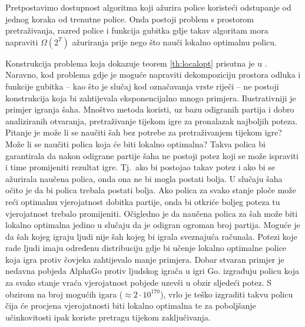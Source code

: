 \begin{theorem} \label{th:localopt}

  Pretpostavimo dostupnost algoritma koji ažurira police koristeći odstupanje od
  jednog koraka od trenutne police. Onda postoji problem s prostorom
  pretraživanja, razred police i funkcija gubitka gdje takav algoritam mora
  napraviti $\Omega(2^T)$ ažuriranja prije nego što nauči lokalno optimalnu
  policu.

\end{theorem}

Konstrukcija problema koja dokazuje teorem \ref{th:localopt} prisutna je u
\citep{daume15lols}. Naravno, kod problema gdje je moguće napraviti
dekompoziciju prostora odluka i funkcije gubitka -- kao što je slučaj kod
označavanja vrste riječi -- ne postoji konstrukcija koja bi zahtijevala
eksponencijalno mnogo primjera. Ilustrativniji je primjer igranja šaha. Mnoštvo
metoda koristi, uz bazu odigranih partija i dobro analiziranih otvaranja,
pretraživanje tijekom igre za pronalazak najboljih poteza. Pitanje je može li se
naučiti šah bez potrebe za pretraživanjem tijekom igre? Može li se naučiti
polica koja će biti lokalno optimalna? Takva polica bi garantirala da nakon
odigrane partije šaha ne postoji potez koji se može ispraviti i time promijeniti
rezultat igre. Tj.~ako bi postojao takav potez i ako bi se ažurirala naučena
polica, onda ona ne bi mogla postati bolja. U slučaju šaha očito je da bi polica
trebala postati bolja. Ako polica za svako stanje ploče može reći optimalnu
vjerojatnost dobitka partije, onda bi otkriće boljeg poteza tu vjerojatnost
trebalo promijeniti. Očigledno je da naučena polica za šah može biti lokalno
optimalna jedino u slučaju da je odigran ogroman broj partija. Moguće je da šah
kojeg igraju ljudi nije šah kojeg bi igrala sveznajuća računala. Potezi koje
rade ljudi imaju određenu distribuciju gdje bi učenje lokalno optimalne police
koja igra protiv čovjeka zahtijevalo manje primjera. Dobar stvaran primjer je
nedavna pobjeda AlphaGo protiv ljudskog igrača u igri Go.
\citet{silver2016mastering} izgrađuju policu koja za svako stanje vraća
vjerojatnost pobjede uzevši u obzir sljedeći potez. S obzirom na broj mogućih
igara ($\approx 2\cdot10^{170}$), vrlo je teško izgraditi takvu policu čija će
procjena vjerojatnosti biti lokalno optimalna te za poboljšanje učinkovitosti
ipak koriste pretragu tijekom zaključivanja.
